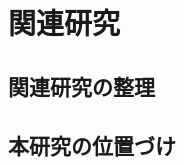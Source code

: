 \chapter{関連研究}
\label{chap:related-work}

\section{関連研究の整理}
\label{sec:related-studies}

\section{本研究の位置づけ}
\label{sec:position}
